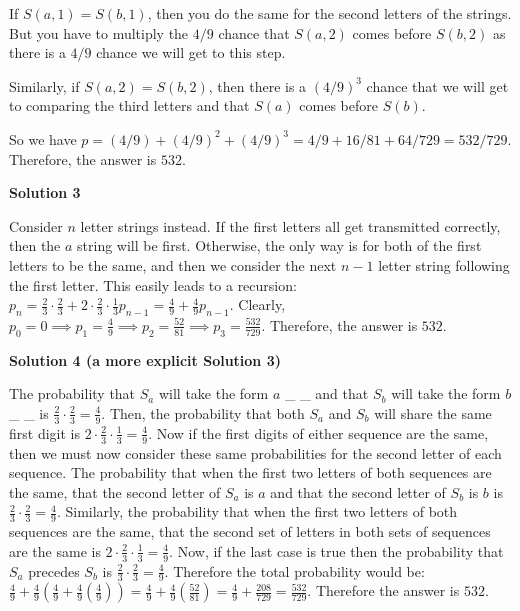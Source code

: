 \begin{enumerate}
 If $S(a,1)=S(b,1)$, then you do the same for the second letters of the strings.  But you have to multiply the $4/9$ chance that $S(a,2)$ comes before $S(b,2)$ as there is a $4/9$ chance we will get to this step.

 Similarly, if $S(a,2)=S(b,2)$, then there is a $(4/9)^3$ chance that we will get to comparing the third letters and that $S(a)$ comes before $S(b)$.

 So we have $p=(4/9)+(4/9)^2+(4/9)^3=4/9+16/81+64/729=532/729$. Therefore, the answer is $\boxed{532}$. 

 



\textbf{Solution 3}

Consider $n$ letter strings instead. If the first letters all get transmitted correctly, then the $a$ string will be first. Otherwise, the only way is for both of the first letters to be the same, and then we consider the next $n-1$ letter string following the first letter. This easily leads to a recursion: $p_n=\frac23\cdot\frac23+2\cdot\frac23\cdot\frac13p_{n-1}=\frac49+\frac49p_{n-1}$. Clearly, $p_0=0\implies p_1=\frac49\implies p_2=\frac{52}{81}\implies p_3=\frac{532}{729}$. Therefore, the answer is $\boxed{532}$.

 



\textbf{Solution 4 (a more explicit Solution 3)}

The probability that $S_a$ will take the form $a$ \_ \_ and that $S_b$ will take the form $b$ \_ \_ is $\frac{2}{3}\cdot\frac{2}{3} = \frac{4}{9}$. Then, the probability that both $S_a$ and $S_b$ will share the same first digit is $2\cdot\frac{2}{3}\cdot\frac{1}{3} = \frac{4}{9}$. Now if the first digits of either sequence are the same, then we must now consider these same probabilities for the second letter of each sequence. The probability that when the first two letters of both sequences are the same, that the second letter of $S_a$ is $a$ and that the second letter of $S_b$ is $b$ is $\frac{2}{3}\cdot\frac{2}{3}=\frac{4}{9}$. Similarly, the probability that when the first two letters of both sequences are the same, that the second set of letters in both sets of sequences are the same is $2\cdot\frac{2}{3}\cdot\frac{1}{3} = \frac{4}{9}$. Now, if the last case is true then the probability that $S_a$ precedes $S_b$ is $\frac{2}{3}\cdot\frac{2}{3} = \frac{4}{9}$. Therefore the total probability would be: $\frac{4}{9} + \frac{4}{9}\left(\frac{4}{9} + \frac{4}{9}\left(\frac{4}{9}\right)\right) = \frac{4}{9}+\frac{4}{9}\left(\frac{52}{81}\right) = \frac{4}{9} + \frac{208}{729} = \frac{532}{729}$. Therefore the answer is $\boxed{532}$.


\end{enumerate}
